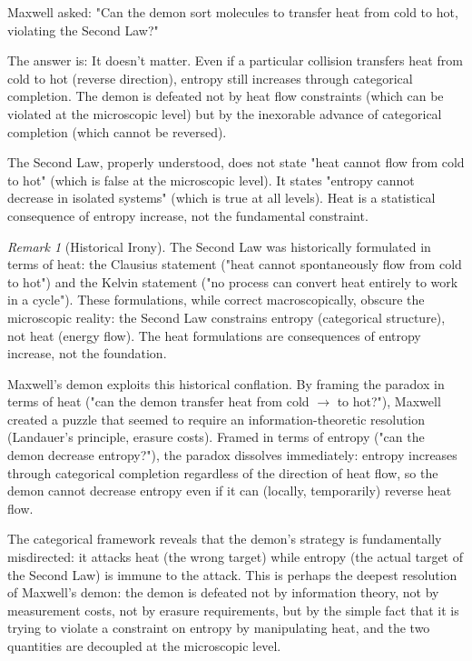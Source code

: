 \documentclass[12pt,a4paper]{article}
\theoremstyle{definition}
\theoremstyle{remark}
\newtheorem{remark}[theorem]{Remark}
\begin{document}
Maxwell asked: "Can the demon sort molecules to transfer heat from cold to hot, violating the Second Law?"

The answer is: It doesn't matter. Even if a particular collision transfers heat from cold to hot (reverse direction), entropy still increases through categorical completion. The demon is defeated not by heat flow constraints (which can be violated at the microscopic level) but by the inexorable advance of categorical completion (which cannot be reversed).

The Second Law, properly understood, does not state "heat cannot flow from cold to hot" (which is false at the microscopic level). It states "entropy cannot decrease in isolated systems" (which is true at all levels). Heat is a statistical consequence of entropy increase, not the fundamental constraint.

\begin{remark}[Historical Irony]
\label{rem:historical_irony}
The Second Law was historically formulated in terms of heat: the Clausius statement ("heat cannot spontaneously flow from cold to hot") and the Kelvin statement ("no process can convert heat entirely to work in a cycle"). These formulations, while correct macroscopically, obscure the microscopic reality: the Second Law constrains entropy (categorical structure), not heat (energy flow). The heat formulations are consequences of entropy increase, not the foundation.

Maxwell's demon exploits this historical conflation. By framing the paradox in terms of heat ("can the demon transfer heat from cold $\to$ to hot?"), Maxwell created a puzzle that seemed to require an information-theoretic resolution (Landauer's principle, erasure costs). Framed in terms of entropy ("can the demon decrease entropy?"), the paradox dissolves immediately: entropy increases through categorical completion regardless of the direction of heat flow, so the demon cannot decrease entropy even if it can (locally, temporarily) reverse heat flow.

The categorical framework reveals that the demon's strategy is fundamentally misdirected: it attacks heat (the wrong target) while entropy (the actual target of the Second Law) is immune to the attack. This is perhaps the deepest resolution of Maxwell's demon: the demon is defeated not by information theory, not by measurement costs, not by erasure requirements, but by the simple fact that it is trying to violate a constraint on entropy by manipulating heat, and the two quantities are decoupled at the microscopic level.
\end{remark}
\end{document}
